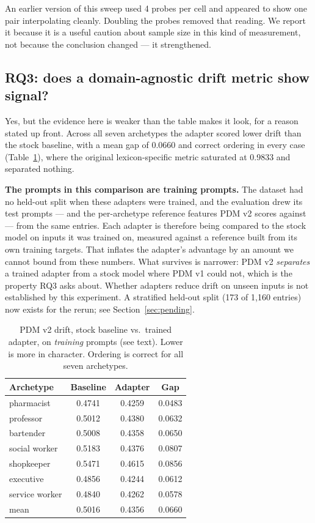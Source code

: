 \documentclass[conference]{IEEEtran}
\begin{document}
An earlier version of this sweep used 4 probes per cell and appeared to show one
pair interpolating cleanly. Doubling the probes removed that reading. We report
it because it is a useful caution about sample size in this kind of measurement,
not because the conclusion changed --- it strengthened.

\subsection{RQ3: does a domain-agnostic drift metric show signal?}

Yes, but the evidence here is weaker than the table makes it look, for a
reason stated up front. Across all seven archetypes the adapter scored lower
drift than the stock baseline, with a mean gap of 0.0660 and correct ordering
in every case (Table~\ref{tab:pdm}), where the original lexicon-specific metric
saturated at 0.9833 and separated nothing.

\textbf{The prompts in this comparison are training prompts.} The dataset had
no held-out split when these adapters were trained, and the evaluation drew
its test prompts --- and the per-archetype reference features PDM v2 scores
against --- from the same entries. Each adapter is therefore being compared to
the stock model on inputs it was trained on, measured against a reference
built from its own training targets. That inflates the adapter's advantage by
an amount we cannot bound from these numbers. What survives is narrower: PDM
v2 \emph{separates} a trained adapter from a stock model where PDM v1 could
not, which is the property RQ3 asks about. Whether adapters reduce drift on
unseen inputs is not established by this experiment. A stratified held-out
split (173 of 1{,}160 entries) now exists for the rerun; see
Section~\ref{sec:pending}.

\begin{table}[t]
\caption{PDM v2 drift, stock baseline vs.\ trained adapter, on
\emph{training} prompts (see text). Lower is more in character. Ordering is
correct for all seven archetypes.}
\label{tab:pdm}
\centering
\begin{tabular}{lccc}
\toprule
Archetype & Baseline & Adapter & Gap \\
\midrule
pharmacist      & 0.4741 & 0.4259 & 0.0483 \\
professor       & 0.5012 & 0.4380 & 0.0632 \\
bartender       & 0.5008 & 0.4358 & 0.0650 \\
social worker   & 0.5183 & 0.4376 & 0.0807 \\
shopkeeper      & 0.5471 & 0.4615 & 0.0856 \\
executive       & 0.4856 & 0.4244 & 0.0612 \\
service worker  & 0.4840 & 0.4262 & 0.0578 \\
\midrule
mean            & 0.5016 & 0.4356 & 0.0660 \\
\bottomrule
\end{tabular}
\end{table}
\end{document}
